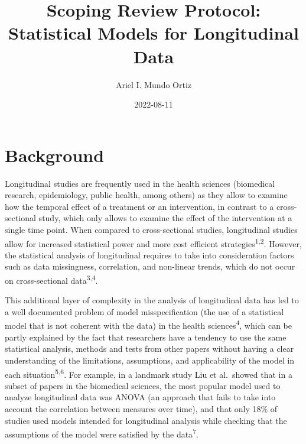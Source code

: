 \documentclass[
]{article}
\title{Scoping Review Protocol: Statistical Models for Longitudinal
Data}
\author{Ariel I. Mundo Ortiz}
\date{2022-08-11}
\renewcommand*\contentsname{Table of contents}
\newcommand\contentsname{Table of contents}
\begin{document}
\maketitle
\ifdefined\Shaded\renewenvironment{Shaded}{\begin{tcolorbox}[frame hidden, interior hidden, sharp corners, enhanced, borderline west={3pt}{0pt}{shadecolor}, boxrule=0pt, breakable]}{\end{tcolorbox}}\fi

\renewcommand*\contentsname{Table of contents}
{
\hypersetup{linkcolor=}
\setcounter{tocdepth}{3}
\tableofcontents
}
\hypertarget{background}{%
\section{Background}\label{background}}

Longitudinal studies are frequently used in the health sciences
(biomedical research, epidemiology, public health, among others) as they
allow to examine how the temporal effect of a treatment or an
intervention, in contrast to a cross-sectional study, which only allows
to examine the effect of the intervention at a single time point. When
compared to cross-sectional studies, longitudinal studies allow for
increased statistical power and more cost efficient
strategies\textsuperscript{1,2}. However, the statistical analysis of
longitudinal requires to take into consideration factors such as data
missingness, correlation, and non-linear trends, which do not occur on
cross-sectional data\textsuperscript{3,4}.

This additional layer of complexity in the analysis of longitudinal data
has led to a well documented problem of model misspecification (the use
of a statistical model that is not coherent with the data) in the health
sciences\textsuperscript{4}, which can be partly explained by the fact
that researchers have a tendency to use the same statistical analysis,
methods and tests from other papers without having a clear understanding
of the limitations, assumptions, and applicability of the model in each
situation\textsuperscript{5,6}. For example, in a landmark study Liu et
al.~showed that in a subset of papers in the biomedical sciences, the
most popular model used to analyze longitudinal data was ANOVA (an
approach that fails to take into account the correlation between
measures over time), and that only 18\% of studies used models intended
for longitudinal analysis while checking that the assumptions of the
model were satisfied by the data\textsuperscript{7}.
\end{document}
